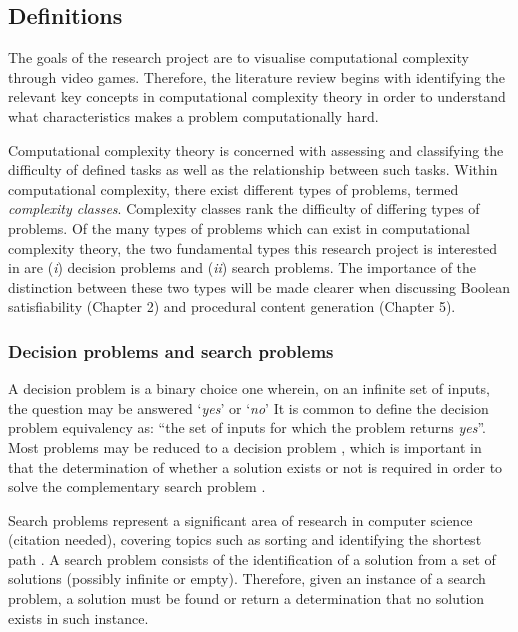\documentclass[11pt, a4paper, oneside]{report} %
\begin{document}
\subsection{Definitions}

The goals of the research project are to visualise computational complexity
through video games. Therefore, the literature review begins with identifying
the relevant key concepts in computational complexity theory in order to
understand what characteristics makes a problem computationally hard.

Computational complexity theory is concerned with assessing and classifying the
difficulty of defined tasks as well as the relationship between such tasks.
Within computational complexity, there exist different types of problems, termed
\textit{complexity classes}. Complexity classes rank the difficulty of differing
types of problems. Of the many types of problems which can exist in
computational complexity theory, the two fundamental types this research project
is interested in are (\textit{i}) decision problems and (\textit{ii}) search
problems. The importance of the distinction between these two types will be made
clearer when discussing Boolean satisfiability (Chapter 2) and procedural
content generation (Chapter 5).

\subsubsection{Decision problems and search problems}

A decision problem is a binary choice one wherein, on an infinite set of inputs,
the question may be answered `\textit{yes}' or `\textit{no}'  It is common  to
define the decision problem equivalency as: ``the set of inputs for which the
problem returns \textit{yes}''. Most problems may be reduced to a decision
problem \cite{kendall2008survey}, which is important in that the determination
of whether a solution exists or not is required in order to solve the
complementary search problem \cite{Goldreich:2008}.

Search problems represent a significant area of research in computer science
(citation needed), covering topics such as sorting and identifying the shortest
path \cite{Goldreich:2008}. A search problem consists of the identification of a
solution from a set of solutions (possibly infinite or empty). Therefore, given
an instance of a search problem, a solution must be found or return a
determination that no solution exists in such instance.
\end{document}
